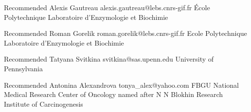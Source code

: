 \documentclass[num-refs]{wiley-article}
\begin{document}

Recommended
Alexis Gautreau
alexis.gautreau@lebs.cnrs-gif.fr
École Polytechnique
Laboratoire d'Enzymologie et Biochimie

Recommended
Roman Gorelik
roman.gorelik@lebs.cnrs-gif.fr
Ecole Polytechnique
Laboratoire d'Enzymologie et Biochimie

Recommended
Tatyana Svitkina
svitkina@sas.upenn.edu
University of Pennsylvania

Recommended
Antonina Alexandrova
tonya_alex@yahoo.com
FBGU National Medical Research Center of Oncology named after N N Blokhin Research Institute of Carcinogenesis
\fi
\end{document}
